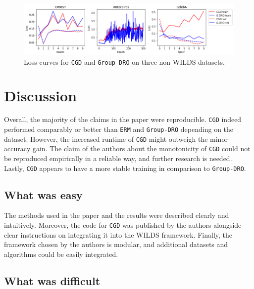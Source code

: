 {\begin{figure}[H]
    \includegraphics[width=\textwidth]{media/loss-plot-camera-ready.png}
    \centering
    \caption{Loss curves for \texttt{CGD} and \texttt{Group-DRO} on three non-WILDS datasets.}
    \label{fig:monotonicity}
\end{figure}

\section{Discussion}

Overall, the majority of the claims in the paper were reproducible. \texttt{CGD} indeed performed comparably or better than \texttt{ERM} and \texttt{Group-DRO} depending on the dataset. However, the increased runtime of \texttt{CGD} might outweigh the minor accuracy gain. The claim of the authors about the monotonicity of \texttt{CGD} could not be reproduced empirically in a reliable way, and further research is needed. Lastly, \texttt{CGD} appears to have a more stable training in comparison to \texttt{Group-DRO}.

\subsection{What was easy}

The methods used in the paper and the results were described clearly and intuitively. Moreover, the code for \texttt{CGD} was published by the authors alongside clear instructions on integrating it into the WILDS framework. Finally, the framework chosen by the authors is modular, and additional datasets and algorithms could be easily integrated.

\subsection{What was difficult}

}
